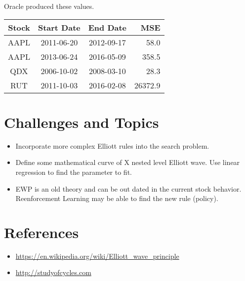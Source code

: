 \documentclass[12pt]{article}
\begin{document}
Oracle produced these values.

\begin{tabular}{cccr}
  Stock & Start Date & End Date & MSE \\
  \hline
  AAPL & 2011-06-20 & 2012-09-17 & 58.0 \\ 
  AAPL & 2013-06-24 & 2016-05-09 & 358.5 \\
  QDX  & 2006-10-02 & 2008-03-10 & 28.3 \\
RUT  & 2011-10-03 & 2016-02-08 & 26372.9 \\
\end{tabular}

\section{Challenges and Topics}

\begin{itemize}
\item Incorporate more complex Elliott rules into the search problem.
\item Define some mathematical curve of X nested level Elliott
  wave. Use linear regression to find the parameter to fit.
\item EWP is an old theory and can be out dated in the current stock
  behavior. Reenforcement Learning may be able to find the new rule
  (policy).
\end{itemize}

\section*{References}

\begin{itemize}
\item \url{https://en.wikipedia.org/wiki/Elliott_wave_principle}
\item \url{http://studyofcycles.com}
\end{itemize}
     
\end{document}
